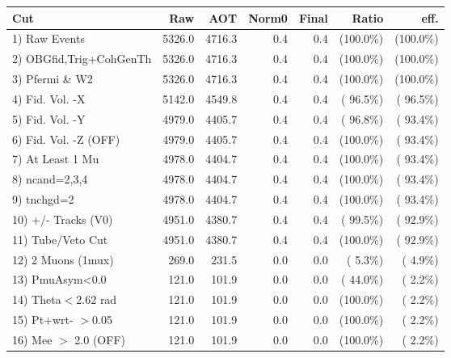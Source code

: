  \begin{table}[h!]\centering
 \begin{tabular}{||l||r|r|r|r|r|r||}
 \hline
 \hline
 Cut & Raw & AOT & Norm0 & Final & Ratio & eff.       \\
 \hline
  1) Raw Events           &       5326.0 &       4716.3 &          0.4 &          0.4 & (100.0\%) & (100.0\%) \\
  2) OBGfid,Trig+CohGenTh &       5326.0 &       4716.3 &          0.4 &          0.4 & (100.0\%) & (100.0\%) \\
  3) Pfermi \& W2         &       5326.0 &       4716.3 &          0.4 &          0.4 & (100.0\%) & (100.0\%) \\
  4) Fid. Vol. -X         &       5142.0 &       4549.8 &          0.4 &          0.4 & ( 96.5\%) & ( 96.5\%) \\
  5) Fid. Vol. -Y         &       4979.0 &       4405.7 &          0.4 &          0.4 & ( 96.8\%) & ( 93.4\%) \\
  6) Fid. Vol. -Z (OFF)   &       4979.0 &       4405.7 &          0.4 &          0.4 & (100.0\%) & ( 93.4\%) \\
  7) At Least 1 Mu        &       4978.0 &       4404.7 &          0.4 &          0.4 & (100.0\%) & ( 93.4\%) \\
  8) ncand=2,3,4          &       4978.0 &       4404.7 &          0.4 &          0.4 & (100.0\%) & ( 93.4\%) \\
  9) tnchgd=2             &       4978.0 &       4404.7 &          0.4 &          0.4 & (100.0\%) & ( 93.4\%) \\
 10) +/- Tracks (V0)      &       4951.0 &       4380.7 &          0.4 &          0.4 & ( 99.5\%) & ( 92.9\%) \\
 11) Tube/Veto Cut        &       4951.0 &       4380.7 &          0.4 &          0.4 & (100.0\%) & ( 92.9\%) \\
 12) 2 Muons (1mux)       &        269.0 &        231.5 &          0.0 &          0.0 & (  5.3\%) & (  4.9\%) \\
 13) PmuAsym<0.0          &        121.0 &        101.9 &          0.0 &          0.0 & ( 44.0\%) & (  2.2\%) \\
 14) Theta$<$2.62 rad     &        121.0 &        101.9 &          0.0 &          0.0 & (100.0\%) & (  2.2\%) \\
 15) Pt+wrt- $>$0.05      &        121.0 &        101.9 &          0.0 &          0.0 & (100.0\%) & (  2.2\%) \\
 16) Mee $>$ 2.0  (OFF)   &        121.0 &        101.9 &          0.0 &          0.0 & (100.0\%) & (  2.2\%) \\

\end{tabular}
\end{table}
